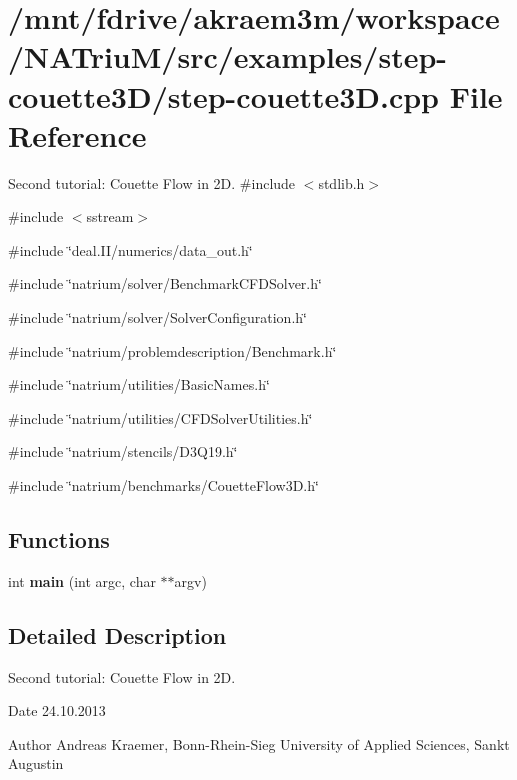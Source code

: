 \hypertarget{step-couette3D_8cpp}{
\section{/mnt/fdrive/akraem3m/workspace/NATriuM/src/examples/step-\/couette3D/step-\/couette3D.cpp File Reference}
\label{step-couette3D_8cpp}
}


Second tutorial: Couette Flow in 2D.  
{\ttfamily \#include $<$stdlib.h$>$}\par
{\ttfamily \#include $<$sstream$>$}\par
{\ttfamily \#include \char`\"{}deal.II/numerics/data\_\-out.h\char`\"{}}\par
{\ttfamily \#include \char`\"{}natrium/solver/BenchmarkCFDSolver.h\char`\"{}}\par
{\ttfamily \#include \char`\"{}natrium/solver/SolverConfiguration.h\char`\"{}}\par
{\ttfamily \#include \char`\"{}natrium/problemdescription/Benchmark.h\char`\"{}}\par
{\ttfamily \#include \char`\"{}natrium/utilities/BasicNames.h\char`\"{}}\par
{\ttfamily \#include \char`\"{}natrium/utilities/CFDSolverUtilities.h\char`\"{}}\par
{\ttfamily \#include \char`\"{}natrium/stencils/D3Q19.h\char`\"{}}\par
{\ttfamily \#include \char`\"{}natrium/benchmarks/CouetteFlow3D.h\char`\"{}}\par
\subsection*{Functions}
\begin{DoxyCompactItemize}
\item 
\hypertarget{step-couette3D_8cpp_a3c04138a5bfe5d72780bb7e82a18e627}{
int {\bfseries main} (int argc, char $\ast$$\ast$argv)}
\label{step-couette3D_8cpp_a3c04138a5bfe5d72780bb7e82a18e627}

\end{DoxyCompactItemize}


\subsection{Detailed Description}
Second tutorial: Couette Flow in 2D. \begin{DoxyDate}{Date}
24.10.2013 
\end{DoxyDate}
\begin{DoxyAuthor}{Author}
Andreas Kraemer, Bonn-\/Rhein-\/Sieg University of Applied Sciences, Sankt Augustin 
\end{DoxyAuthor}
